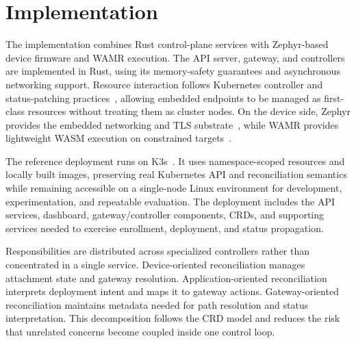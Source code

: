 \section{Implementation}\label{sec:implementation}

The implementation combines Rust control-plane services with Zephyr-based device firmware and WAMR execution. The API server, gateway, and controllers are implemented in Rust, using its memory-safety guarantees and asynchronous networking support. Resource interaction follows Kubernetes controller and status-patching practices~\cite{kubernetes,kubernetes_operators}, allowing embedded endpoints to be managed as first-class resources without treating them as cluster nodes. On the device side, Zephyr provides the embedded networking and TLS substrate~\cite{zephyr}, while WAMR provides lightweight WASM execution on constrained targets~\cite{wamr}.

The reference deployment runs on K3s~\cite{k3s}. It uses namespace-scoped resources and locally built images, preserving real Kubernetes API and reconciliation semantics while remaining accessible on a single-node Linux environment for development, experimentation, and repeatable evaluation. The deployment includes the API services, dashboard, gateway/controller components, CRDs, and supporting services needed to exercise enrollment, deployment, and status propagation.

Responsibilities are distributed across specialized controllers rather than concentrated in a single service. Device-oriented reconciliation manages attachment state and gateway resolution. Application-oriented reconciliation interprets deployment intent and maps it to gateway actions. Gateway-oriented reconciliation maintains metadata needed for path resolution and status interpretation. This decomposition follows the CRD model and reduces the risk that unrelated concerns become coupled inside one control loop.

